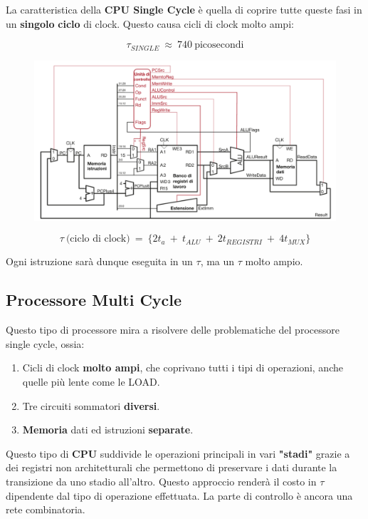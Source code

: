 \documentclass{article}
\begin{document}
La caratteristica della \textbf{CPU Single Cycle} è quella di coprire tutte queste fasi in un \textbf{singolo} \textbf{ciclo} di clock. Questo causa cicli di clock molto ampi:

\[ \tau_{SINGLE} \: \approx \: 740 \: \text{picosecondi} \]

    \begin{figure}[htbp]
        \center
        \includegraphics[scale=0.45]{img/implementazione_single_cycle.png}
    \end{figure}

\[ \tau \: \text{(ciclo di clock)} \: = \: \{ 2t_{a}\:+\:t_{ALU}\:+\:2t_{REGISTRI}\:+\:4t_{MUX} \} \]

\vspace*{15px}

Ogni istruzione sarà dunque eseguita in un $\tau$, ma un $\tau$ molto ampio.

\newpage

\subsection{Processore Multi Cycle}

Questo tipo di processore mira a risolvere delle problematiche del processore single cycle, ossia:

\begin{enumerate}
    \item Cicli di clock \textbf{molto ampi}, che coprivano tutti i tipi di operazioni, anche quelle più lente come le LOAD.
    \item Tre circuiti sommatori \textbf{diversi}.
        \item \textbf{Memoria} dati ed istruzioni \textbf{separate}.
\end{enumerate}

Questo tipo di \textbf{CPU} suddivide le operazioni principali in vari \textbf{"stadi"} grazie a dei registri non architetturali che permettono di preservare i dati durante la transizione da uno stadio all'altro. Questo approccio renderà il costo in $\tau$ dipendente dal tipo di operazione effettuata.
La parte di controllo è ancora una rete combinatoria.
\end{document}
